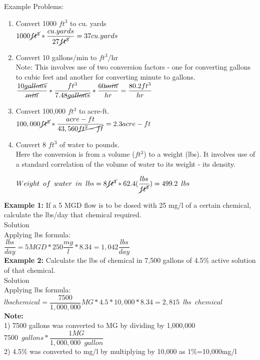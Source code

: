 \documentclass{article}
\begin{document}
Example Problems:\\
\begin{enumerate}
\item Convert 1000 $ft^3$ to cu. yards\\

$1000 \cancel{ft^3}*\dfrac{cu.yards}{27\cancel{ft^3}} = 37 cu.yards$

\item Convert 10 gallons/min to $ft^3$/hr\\
Note:  This involves use of two conversion factors - one for converting gallons to cubic feet and another for converting minute to gallons.\\ 
$\dfrac{10 \cancel{gallons}}{\cancel{min}}*  \dfrac{ft^3}{7.48 \cancel{gallons}}  * \dfrac{60 \cancel{min}}{hr}   = \dfrac{80.2ft^3}{hr}$


\item Convert 100,000 $ft^3$ to acre-ft.\\
$100,000 \cancel{ft^3} * \dfrac{acre-ft}{43,560 \cancel{ft^2-ft}} =  2.3 acre-ft$\\

\item Convert 8 $ft^3$ of water to pounds.\\
Here the conversion is from a volume ($ft^3$) to a weight (lbs).  It involves use of a standard correlation of the volume of water to its weight - its density. 

$Weight \enspace of \enspace water \enspace in \enspace lbs=8 \cancel{ft^3} *   62.4  (\dfrac{lbs}{\cancel{ft^3}}) = 499.2 \enspace lbs $\\

\end{enumerate}
\textbf{Example 1:} If a 5 MGD flow is to be dosed with 25 mg/l of a certain chemical, calculate the lbs/day that chemical required.\\

Solution\\

Applying lbs formula:\\
$\dfrac{lbs}{day}=5 MGD *250\dfrac{mg}{l}*8.34 = \boxed{1,042\dfrac{lbs}{day}}$
\\
\vspace{6pt}
\textbf{Example 2:} Calculate the lbs of chemical in 7,500 gallons of 4.5\% active solution of that chemical.\\
Solution\\
Applying lbs formula:\\
$lbs chemical = \dfrac{7500}{1,000,000}MG * 4.5*10,000 *8.34 = \boxed{2,815 \enspace lbs \enspace chemical}$\\
\textbf{Note:}\\  
1) 7500 gallons was converted to MG by dividing by 1,000,000\\
$7500 \enspace gallons * \dfrac{1 MG}{1,000,000 \enspace gallon}$\\
2) 4.5\% was converted to mg/l by multiplying by 10,000 as 1\%=10,000mg/l
\end{document}

